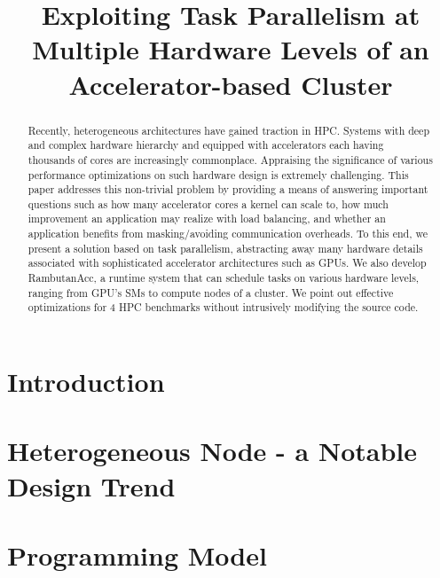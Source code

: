 \documentclass[sigconf]{acmart}
\begin{document}
\title{Exploiting Task Parallelism at Multiple Hardware Levels of an Accelerator-based Cluster}


\begin{abstract}
Recently, heterogeneous architectures have gained traction in HPC. Systems with deep and complex hardware hierarchy and equipped with accelerators each having thousands of cores are increasingly commonplace. Appraising the significance of various performance optimizations on such hardware design is extremely challenging. This paper addresses this non-trivial problem by providing a means of answering important questions such as how many accelerator cores a kernel can scale to, how much improvement an application may realize with load balancing, and whether an application benefits from masking/avoiding communication overheads. To this end, we present a solution based on task parallelism, abstracting away many hardware details associated with sophisticated accelerator architectures such as GPUs. We also develop RambutanAcc, a runtime system that can schedule tasks on various hardware levels, ranging from GPU's SMs to compute nodes of a cluster. We point out effective optimizations for 4 HPC benchmarks without intrusively modifying the source code.
\end{abstract}

\maketitle

\section{Introduction}
\label{sec:intro}


\section{Heterogeneous Node - a Notable Design Trend}
\label{sec:motivation}


\section{Programming Model}
\label{sec:model}

\end{document}

